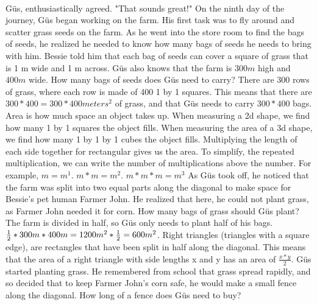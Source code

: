  \paragraph{} G{\"u}s, enthusiastically agreed. "That sounds great!"
 \pagebreak
{On the ninth day of the journey, G{\"u}s began working on the farm. His first task was to fly around and scatter grass seeds on the farm. As he went into the store room to find the bags of seeds, he realized he needed to know how many bags of seeds he needs to bring with him. Bessie told him that each bag of seeds can cover a square of grass that is 1 m wide and 1 m across. G{\"u}s also knows that the farm is $300 m$ high and $400 m$ wide. How many bags of seeds does G{\"u}s need to carry?}
{There are 300 rows of grass, where each row is made of 400 1 by 1 squares. This means that there are $300\ast 400 = 300\ast 400 meters^{2}$ of grass, and that G{\"u}s needs to carry $300\ast 400$ bags.}
{Area is how much space an object takes up. When measuring a 2d shape, we find how many 1 by 1 squares the object fills. When measuring the area of a 3d shape, we find how many 1 by 1 by 1 cubes the object fills. Multiplying the length of each side together for rectangular gives us the area. To simplify, the repeated multiplication, we can write the number of multiplications above the number. For example, $m = m^1$. $m*m = m^2$. $m*m*m = m^3$ }
{}
{As G{\"u}s took off, he noticed that the farm was split into two equal parts along the diagonal to make space for Bessie's pet human Farmer John. He realized that here, he could not plant grass, as Farmer John needed it for corn. How many bags of grass should G{\"u}s plant?}
{The farm is divided in half, so G{\"u}s only needs to plant half of his bags. $\frac{1}{2}\ast 300m\ast 400m\linebreak=1200m^{2}\ast\frac{1}{2} \linebreak=600m^{2}$.}
{Right triangles (triangles with a square edge), are rectangles that have been split in half along the diagonal. This means that the area of a right triangle with side lengths x and y has an area of $\frac{x\ast y}{2}$.}
{}
{G{\"u}s started planting grass. He remembered from school that grass spread rapidly, and so decided that to keep Farmer John's corn safe, he would make a small fence along the diagonal. How long of a fence does G{\"u}s need to buy?}
